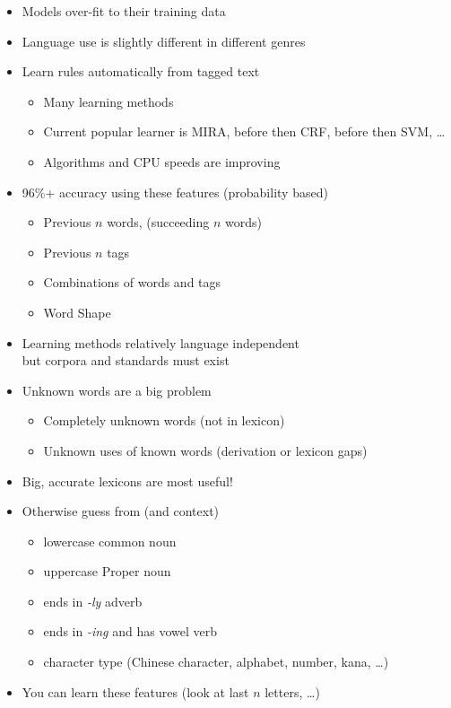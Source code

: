 \documentclass[a4paper,landscape,headrule,footrule,xetex]{foils}
\begin{document}
\begin{itemize}
\item Models over-fit to their training data
\item Language use is slightly different in different genres
\end{itemize}

\MyLogo{}
\begin{itemize}
\item Learn rules automatically from tagged text
  \begin{itemize}
  \item Many learning methods
  \item Current popular learner is MIRA, before then CRF, before then SVM, \ldots
  \item Algorithms and CPU speeds are improving
  \end{itemize}
\item 96\%+ accuracy using these features (probability based)
  \begin{itemize}
  \item Previous $n$ words, (succeeding $n$ words)
  \item Previous $n$ tags
  \item Combinations of words and tags
  \item Word Shape
\end{itemize}
\item Learning methods relatively language independent 
  \\ but corpora and standards must exist
\end{itemize}

\MyLogo{}
\begin{itemize}
\item Unknown words are a big problem
  \begin{itemize}
  \item Completely unknown words (not in lexicon)
  \item Unknown uses of known words (derivation or lexicon gaps)
  \end{itemize}
\item Big, accurate lexicons are most useful!
\item Otherwise guess from  (and context)
  \begin{itemize}
  \item lowercase \into common noun
  \item uppercase \into Proper noun
  \item ends in \textit{-ly} \into adverb
  \item ends in \textit{-ing} and has vowel \into verb
  \item character type (Chinese character, alphabet, number, kana, \ldots)
  \end{itemize}
\item You can learn these features (look at last $n$ letters, \ldots)
\end{itemize}
\end{document}
